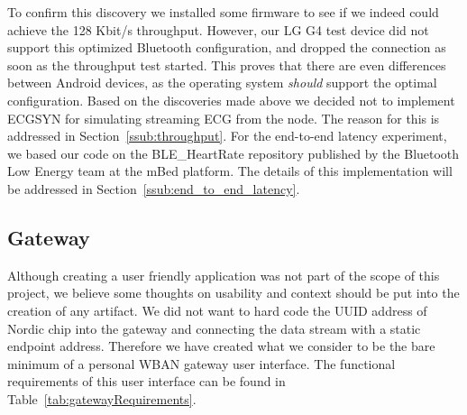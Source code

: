 To confirm this discovery we installed some firmware \cite{nordic:throughputtest} to see if we indeed could achieve the 128 Kbit/s throughput. However, our LG G4 test device did not support this optimized Bluetooth configuration, and dropped the connection as soon as the throughput test started. This proves that there are even differences between Android devices, as the operating system \emph{should} support the optimal configuration. Based on the discoveries made above we decided not to implement ECGSYN for simulating streaming ECG from the node. The reason for this is addressed in Section~\ref{ssub:throughput}. For the end-to-end latency experiment, we based our code on the BLE\_HeartRate repository \cite{mbed:bleheartrate} published by the Bluetooth Low Energy team at the mBed platform. The details of this implementation will be addressed in Section~\ref{ssub:end_to_end_latency}.


\subsection{Gateway} %
\label{sub:gateway}

Although creating a user friendly application was not part of the scope of this project, we believe some thoughts on usability and context should be put into the creation of any artifact. We did not want to hard code the UUID address of Nordic chip into the gateway and connecting the data stream with a static endpoint address. Therefore we have created what we consider to be the bare minimum of a personal WBAN gateway user interface. The functional requirements of this user interface can be found in Table~\ref{tab:gatewayRequirements}.

